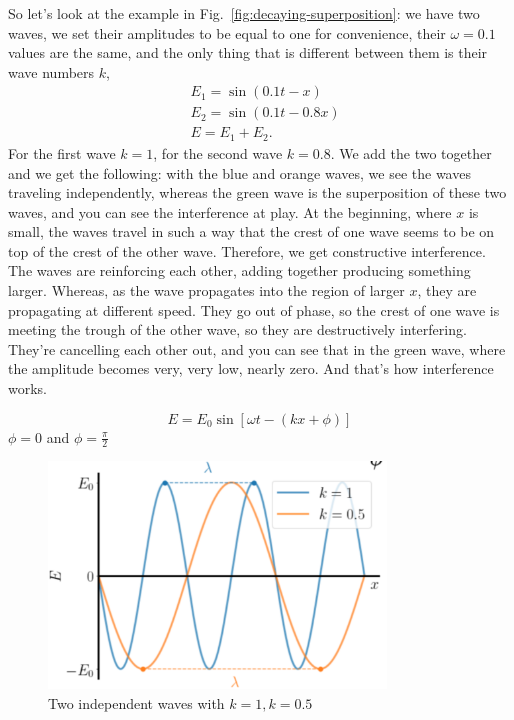 So let's look at the example in Fig.~\ref{fig:decaying-superposition}: we have two waves, we set their amplitudes to be equal to one for convenience, their $\omega = 0.1$ values are the same, and the only thing that is different between them is their wave numbers $k$,
\begin{equation}
\begin{aligned}
&E_{1}=\sin (0.1 t-x) \\
&E_{2}=\sin (0.1 t-0.8 x) \\
&E=E_{1}+E_{2}.
\end{aligned}
\end{equation}
For the first wave $k=1$, for the second wave $k=0.8$. We add the two together and we get the following: with the blue and orange waves, we see the waves traveling independently, whereas the green wave is the superposition of these two waves, and you can see the interference at play. At the beginning, where $x$ is small, the waves travel in such a way that the crest of one wave seems to be on top of the crest of the other wave. Therefore, we get constructive interference. The waves are reinforcing each other, adding together producing something larger. Whereas, as the wave propagates into the region of larger $x$, they are propagating at different speed. They go out of phase, so the crest of one wave is meeting the trough of the other wave, so they are destructively interfering. They're cancelling each other out, and you can see that in the green wave, where the amplitude becomes very, very low, nearly zero. And that's how interference works.

\begin{equation}
E=E_{0} \sin [\omega t-(k x+\phi)]
\end{equation}
$\phi = 0$ and $\phi = \frac{\pi}{2}$
\fi

\begin{figure}[H]
   \centering
    \includegraphics[width=0.8\textwidth]{lesson6/k.pdf}
        \caption{Two independent waves with $k=1, k=0.5$}    
    \label{fig:two-waves}
\end{figure}

